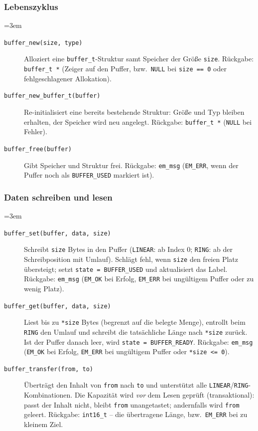 \subsubsection*{Lebenszyklus}
{\sloppy\emergencystretch=3em
\begin{description}
\item[\texttt{buffer\_new(size, type)}] Alloziert eine \verb|buffer_t|-Struktur
  samt Speicher der Größe \verb|size|. Rückgabe: \verb|buffer_t *| (Zeiger auf
  den Puffer, bzw.\ \verb|NULL| bei \verb|size == 0| oder fehlgeschlagener
  Allokation).
\item[\texttt{buffer\_new\_buffer\_t(buffer)}] Re-initialisiert eine bereits
  bestehende Struktur: Größe und Typ bleiben erhalten, der Speicher wird neu
  angelegt. Rückgabe: \verb|buffer_t *| (\verb|NULL| bei Fehler).
\item[\texttt{buffer\_free(buffer)}] Gibt Speicher und Struktur frei. Rückgabe:
  \verb|em_msg| (\verb|EM_ERR|, wenn der Puffer noch als \verb|BUFFER_USED|
  markiert ist).
\end{description}
\par}

\subsubsection*{Daten schreiben und lesen}
{\sloppy\emergencystretch=3em
\begin{description}
\item[\texttt{buffer\_set(buffer, data, size)}] Schreibt \verb|size| Bytes in
  den Puffer (\verb|LINEAR|: ab Index $0$; \verb|RING|: ab der Schreibposition
  mit Umlauf). Schlägt fehl, wenn \verb|size| den freien Platz übersteigt;
  setzt \verb|state = BUFFER_USED| und aktualisiert das Label. Rückgabe:
  \verb|em_msg| (\verb|EM_OK| bei Erfolg, \verb|EM_ERR| bei ungültigem Puffer
  oder zu wenig Platz).
\item[\texttt{buffer\_get(buffer, data, size)}] Liest bis zu \verb|*size| Bytes
  (begrenzt auf die belegte Menge), entrollt beim \verb|RING| den Umlauf und
  schreibt die tatsächliche Länge nach \verb|*size| zurück. Ist der Puffer
  danach leer, wird \verb|state = BUFFER_READY|. Rückgabe: \verb|em_msg|
  (\verb|EM_OK| bei Erfolg, \verb|EM_ERR| bei ungültigem Puffer oder
  \verb|*size <= 0|).
\item[\texttt{buffer\_transfer(from, to)}] Überträgt den Inhalt von \verb|from|
  nach \verb|to| und unterstützt alle \verb|LINEAR|/\verb|RING|-Kombinationen.
  Die Kapazität wird \emph{vor} dem Lesen geprüft (transaktional): passt der
  Inhalt nicht, bleibt \verb|from| unangetastet; andernfalls wird \verb|from|
  geleert. Rückgabe: \verb|int16_t| -- die übertragene Länge, bzw.\
  \verb|EM_ERR| bei zu kleinem Ziel.
\end{description}
\par}

